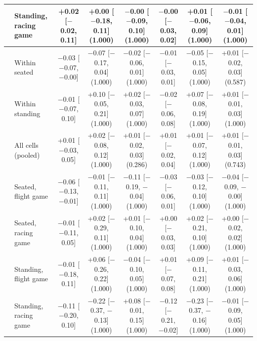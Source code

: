 \begin{table}[ht]
\begin{tabular}{@{}llcccccc@{}}
 & Standing, racing game & +0.02 [$-$0.02, 0.11] & +0.00 [$-$0.18, 0.11] (1.000) & $-$0.00 [$-$0.09, 0.10] (1.000) & $-$0.00 [$-$0.03, 0.02] & +0.01 [$-$0.06, 0.09] (1.000) & $-$0.01 [$-$0.04, 0.01] (1.000) \\
\midrule
\sevone{} & Within seated & $-$0.03 [$-$0.07, $-$0.00] & $-$0.07 [$-$0.17, 0.04] (1.000) & $-$0.02 [$-$0.06, 0.01] (1.000) & $-$0.01 [$-$0.03, 0.01] & $-$0.05 [$-$0.15, 0.05] (1.000) & +0.01 [$-$0.02, 0.03] (0.587) \\
 & Within standing & $-$0.01 [$-$0.07, 0.10] & +0.10 [$-$0.05, 0.21] (1.000) & +0.02 [$-$0.03, 0.07] (1.000) & $-$0.02 [$-$0.06, 0.08] & +0.07 [$-$0.08, 0.19] (1.000) & +0.01 [$-$0.01, 0.03] (1.000) \\
 & All cells (pooled) & +0.01 [$-$0.03, 0.05] & +0.02 [$-$0.08, 0.12] (1.000) & +0.01 [$-$0.02, 0.03] (0.286) & +0.01 [$-$0.02, 0.04] & +0.01 [$-$0.07, 0.12] (1.000) & +0.01 [$-$0.01, 0.03] (0.743) \\
 & Seated, flight game & $-$0.06 [$-$0.13, $-$0.01] & $-$0.01 [$-$0.11, 0.11] (1.000) & $-$0.11 [$-$0.19, $-$0.04] (1.000) & $-$0.03 [$-$0.06, 0.01] & $-$0.03 [$-$0.12, 0.10] (1.000) & $-$0.04 [$-$0.09, $-$0.00] (1.000) \\
 & Seated, racing game & $-$0.01 [$-$0.11, 0.05] & +0.02 [$-$0.29, 0.11] (1.000) & +0.01 [$-$0.10, 0.04] (1.000) & +0.00 [$-$0.03, 0.03] & +0.02 [$-$0.21, 0.10] (1.000) & +0.00 [$-$0.02, 0.02] (1.000) \\
 & Standing, flight game & $-$0.01 [$-$0.18, 0.11] & +0.06 [$-$0.26, 0.22] (1.000) & $-$0.04 [$-$0.10, 0.05] (1.000) & +0.01 [$-$0.07, 0.08] & +0.09 [$-$0.11, 0.21] (1.000) & +0.01 [$-$0.03, 0.06] (1.000) \\
 & Standing, racing game & $-$0.11 [$-$0.20, 0.10] & $-$0.22 [$-$0.37, $-$0.13] (1.000) & +0.08 [$-$0.01, 0.15] (1.000) & $-$0.12 [$-$0.21, $-$0.02] & $-$0.23 [$-$0.37, $-$0.16] (1.000) & $-$0.01 [$-$0.09, 0.05] (1.000) \\
\bottomrule
\end{tabular}
\end{table}
